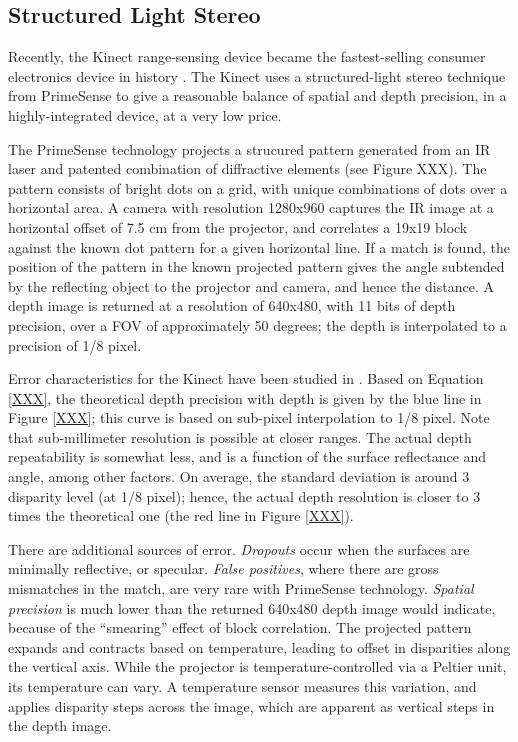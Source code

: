 \documentclass[twocolumn,oneside]{book}
\begin{document}
\subsection{Structured Light Stereo}

Recently, the Kinect range-sensing device became the fastest-selling
consumer electronics device in history \cite{XXX}.  The Kinect uses
a structured-light stereo technique from PrimeSense \cite{XXX} to give
a reasonable balance of spatial and depth precision, in a
highly-integrated device, at a very low price.

The PrimeSense technology projects a strucured pattern generated from
an IR laser and patented combination of diffractive elements (see
Figure XXX).  The pattern consists of bright dots on a grid, with
unique combinations of dots over a horizontal area.  A camera with
resolution 1280x960 captures the IR image at a horizontal offset of
7.5 cm from the projector, and correlates a 19x19 block against the
known dot pattern for a given horizontal line.  If a match is found,
the position of the pattern in the known projected pattern gives the
angle subtended by the reflecting object to the projector and camera,
and hence the distance.  A depth image is returned at a resolution of
640x480, with 11 bits of depth precision, over a FOV of approximately
50 degrees; the depth is interpolated to a precision of 1/8 pixel.

Error characteristics for the Kinect have been studied in
\cite{kinect-error-XXX,kinect-error2-XXX}.  Based on Equation
\ref{XXX}, the theoretical depth precision with depth is given by the
blue line in Figure \ref{XXX}; this curve is based on sub-pixel
interpolation to 1/8 pixel.  Note that sub-millimeter resolution is
possible at closer ranges.  The actual depth repeatability is somewhat
less, and is a function of the surface reflectance and angle, among
other factors.  On average, the standard deviation is around 3
disparity level (at 1/8 pixel); hence, the actual depth resolution is
closer to 3 times the theoretical one (the red line in Figure
\ref{XXX}). 

There are additional sources of error.  {\em Dropouts} occur when the
surfaces are minimally reflective, or specular.  {\em False
  positives}, where there are gross mismatches in the match, are very
rare with PrimeSense technology.  {\em Spatial precision} is much
lower than the returned 640x480 depth image would indicate, because of
the ``smearing'' effect of block correlation.  The projected pattern
expands and contracts based on temperature, leading to offset in
disparities along the vertical axis.  While the projector is
temperature-controlled via a Peltier unit, its temperature can vary.
A temperature sensor measures this variation, and applies disparity
steps across the image, which are apparent as vertical steps in the
depth image.
\end{document}

